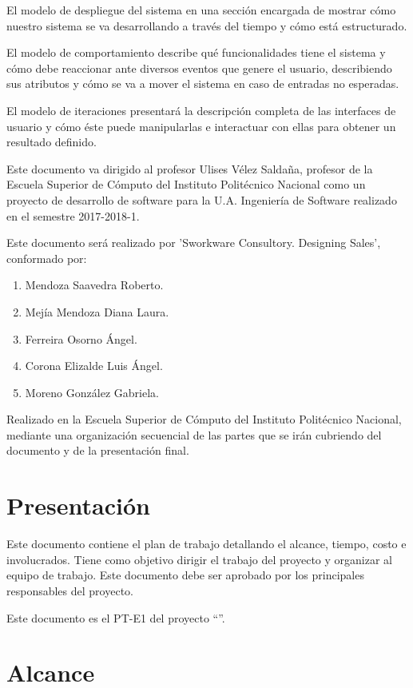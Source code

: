 El modelo de despliegue del sistema en una sección encargada de mostrar cómo nuestro sistema se va desarrollando a través del tiempo y cómo está estructurado.
	
El modelo de comportamiento describe qué funcionalidades tiene el sistema y cómo debe reaccionar ante diversos eventos que genere el usuario, describiendo sus atributos y cómo se va a mover el sistema en caso de entradas no esperadas.
	
El modelo de iteraciones presentará la descripción completa de las interfaces de usuario y cómo éste puede manipularlas e interactuar con ellas para obtener un resultado definido.
	
Este documento va dirigido al profesor Ulises Vélez Saldaña, profesor de la Escuela Superior de Cómputo del Instituto Politécnico Nacional como un proyecto de desarrollo de software para la U.A. Ingeniería de Software realizado en el semestre 2017-2018-1.
	
Este documento será realizado por ’Sworkware Consultory. Designing Sales’, conformado por: 
\begin{enumerate}
	\item Mendoza Saavedra Roberto.
	\item Mejía Mendoza Diana Laura.
	\item Ferreira Osorno Ángel.
	\item Corona Elizalde Luis Ángel.
	\item Moreno González Gabriela.
\end{enumerate}

Realizado en la Escuela Superior de Cómputo del Instituto Politécnico Nacional, mediante una organización secuencial de las partes que se irán cubriendo del documento y de la presentación final.

\section{Presentación}

	Este documento contiene el plan de trabajo detallando el alcance, tiempo, costo e involucrados. Tiene como objetivo dirigir el trabajo del proyecto y organizar al equipo de trabajo. Este documento debe ser aprobado por los principales responsables del proyecto.
	
	Este documento es el PT-E1 del proyecto ``{\em\varProyecto}''.

\section{Alcance}	

